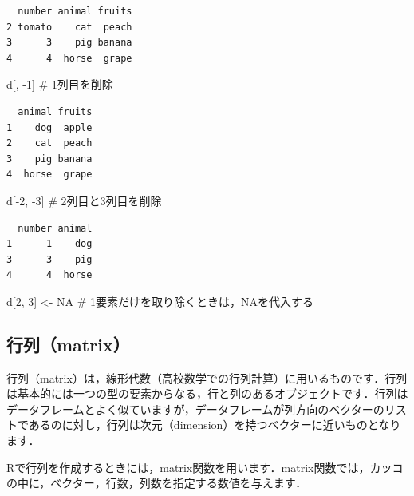 \documentclass[
  letterpaper,
  DIV=11,
  numbers=noendperiod]{scrreprt}
\newenvironment{Shaded}{\begin{snugshade}}{\end{snugshade}}
\newcommand{\CommentTok}[1]{\textcolor[rgb]{0.37,0.37,0.37}{#1}}
\newcommand{\ConstantTok}[1]{\textcolor[rgb]{0.56,0.35,0.01}{#1}}
\newcommand{\DecValTok}[1]{\textcolor[rgb]{0.68,0.00,0.00}{#1}}
\newcommand{\NormalTok}[1]{\textcolor[rgb]{0.00,0.23,0.31}{#1}}
\newcommand{\OtherTok}[1]{\textcolor[rgb]{0.00,0.23,0.31}{#1}}
\newcommand{\SpecialCharTok}[1]{\textcolor[rgb]{0.37,0.37,0.37}{#1}}
\begin{document}
\begin{verbatim}
  number animal fruits
2 tomato    cat  peach
3      3    pig banana
4      4  horse  grape
\end{verbatim}

\begin{Shaded}
\begin{Highlighting}[]
\NormalTok{d[, }\SpecialCharTok{{-}}\DecValTok{1}\NormalTok{] }\CommentTok{\# 1列目を削除}
\end{Highlighting}
\end{Shaded}

\begin{verbatim}
  animal fruits
1    dog  apple
2    cat  peach
3    pig banana
4  horse  grape
\end{verbatim}

\begin{Shaded}
\begin{Highlighting}[]
\NormalTok{d[}\SpecialCharTok{{-}}\DecValTok{2}\NormalTok{, }\SpecialCharTok{{-}}\DecValTok{3}\NormalTok{] }\CommentTok{\# 2列目と3列目を削除}
\end{Highlighting}
\end{Shaded}

\begin{verbatim}
  number animal
1      1    dog
3      3    pig
4      4  horse
\end{verbatim}

\begin{Shaded}
\begin{Highlighting}[]
\NormalTok{d[}\DecValTok{2}\NormalTok{, }\DecValTok{3}\NormalTok{] }\OtherTok{\textless{}{-}} \ConstantTok{NA} \CommentTok{\# 1要素だけを取り除くときは，NAを代入する}
\end{Highlighting}
\end{Shaded}

\hypertarget{ux884cux5217matrix}{%
\subsection{行列（matrix）}\label{ux884cux5217matrix}}

行列（matrix）は，線形代数（高校数学での行列計算）に用いるものです．行列は基本的には一つの型の要素からなる，行と列のあるオブジェクトです．行列はデータフレームとよく似ていますが，データフレームが列方向のベクターのリストであるのに対し，行列は次元（dimension）を持つベクターに近いものとなります．

Rで行列を作成するときには，matrix関数を用います．matrix関数では，カッコの中に，ベクター，行数，列数を指定する数値を与えます．
\end{document}
